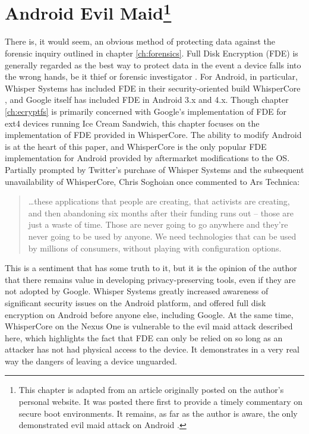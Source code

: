 \chapter[Android Evil Maid]{Android Evil Maid\protect\footnote{ This chapter is adapted from an article originally posted on the author's personal
website. It was posted there first to provide a timely commentary on secure boot environments. It remains, as far as the author is
aware, the only demonstrated evil maid attack on Android \protect\cite{androidevilmaid}.}}
\label{ch:fde}

There is, it would seem, an obvious method of protecting data against the forensic inquiry outlined in chapter \ref{ch:forensics}.
Full Disk Encryption (FDE) is generally regarded as the best way to protect data in the event a device falls into the wrong hands,
be it thief or forensic investigator \cite{fdeworks}.  For Android, in particular, Whisper Systems has included FDE in their
security-oriented build WhisperCore \cite{whispercore}, and Google itself has included FDE in Android 3.x and 4.x. Though chapter
\ref{ch:ecryptfs} is primarily concerned with Google's implementation of FDE for ext4 devices running Ice Cream Sandwich, this chapter
focuses on the implementation of FDE provided in WhisperCore.  The ability to modify Android is at
the heart of this paper, and WhisperCore is the only popular FDE implementation for Android provided by aftermarket modifications to
the OS.  Partially prompted by Twitter's purchase of Whisper Systems and the subsequent unavailability of WhisperCore, Chris
Soghoian once commented to Ars Technica: \begin{quote} 
\ldots these applications that people are creating, that activists are creating, and then abandoning six months after their funding
runs out -- those are just a waste of time. Those are never going to go anywhere and they're never going to be used by anyone. We
need technologies that can be used by millions of consumers, without playing with configuration options. \cite{arstechnica}
\end{quote}
This is a sentiment that has some truth to it, but it is the opinion of the author that there remains value in
developing privacy-preserving tools, even if they are not adopted by Google.  Whisper Systems greatly increased awareness of significant
security issues on the Android platform, and offered full disk encryption on Android before anyone else, including Google. 
At the same time, WhisperCore on the Nexus One is vulnerable to the evil maid attack described here, which highlights the fact that FDE can only be
relied on so long as an attacker has not had physical access to the device. It demonstrates in a very real way the dangers of
leaving a device unguarded. 


